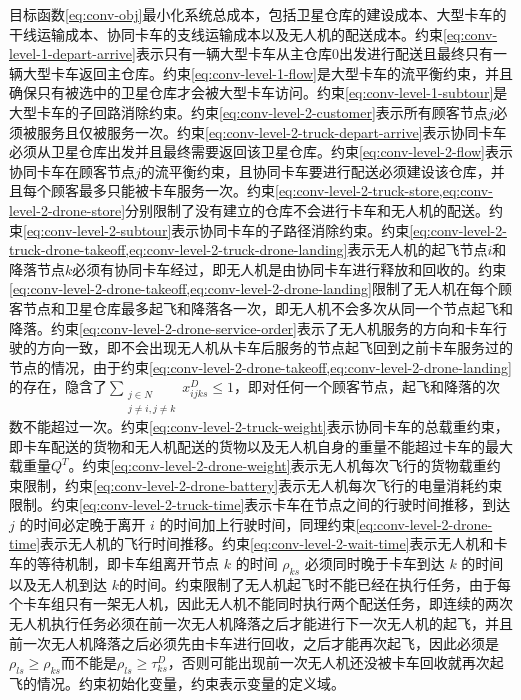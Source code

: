 \documentclass[fontset=none]{ctexart}
\begin{document}
目标函数\cref{eq:conv-obj}最小化系统总成本，包括卫星仓库的建设成本、大型卡车的干线运输成本、协同卡车的支线运输成本以及无人机的配送成本。约束\cref{eq:conv-level-1-depart-arrive}表示只有一辆大型卡车从主仓库$0$出发进行配送且最终只有一辆大型卡车返回主仓库。约束\cref{eq:conv-level-1-flow}是大型卡车的流平衡约束，并且确保只有被选中的卫星仓库才会被大型卡车访问。约束\cref{eq:conv-level-1-subtour}是大型卡车的子回路消除约束。约束\cref{eq:conv-level-2-customer}表示所有顾客节点$j$必须被服务且仅被服务一次。约束\cref{eq:conv-level-2-truck-depart-arrive}表示协同卡车必须从卫星仓库出发并且最终需要返回该卫星仓库。约束\cref{eq:conv-level-2-flow}表示协同卡车在顾客节点$j$的流平衡约束，且协同卡车要进行配送必须建设该仓库，并且每个顾客最多只能被卡车服务一次。约束\cref{eq:conv-level-2-truck-store,eq:conv-level-2-drone-store}分别限制了没有建立的仓库不会进行卡车和无人机的配送。约束\cref{eq:conv-level-2-subtour}表示协同卡车的子路径消除约束。约束\cref{eq:conv-level-2-truck-drone-takeoff,eq:conv-level-2-truck-drone-landing}表示无人机的起飞节点$i$和降落节点$k$必须有协同卡车经过，即无人机是由协同卡车进行释放和回收的。约束\cref{eq:conv-level-2-drone-takeoff,eq:conv-level-2-drone-landing}限制了无人机在每个顾客节点和卫星仓库最多起飞和降落各一次，即无人机不会多次从同一个节点起飞和降落。约束\cref{eq:conv-level-2-drone-service-order}表示了无人机服务的方向和卡车行驶的方向一致，即不会出现无人机从卡车后服务的节点起飞回到之前卡车服务过的节点的情况，由于约束\cref{eq:conv-level-2-drone-takeoff,eq:conv-level-2-drone-landing}的存在，隐含了$\sum_{\substack{j \in N\\ j \neq i, j \neq k}}x_{ijks}^D \leq 1$，即对任何一个顾客节点，起飞和降落的次数不能超过一次。约束\cref{eq:conv-level-2-truck-weight}表示协同卡车的总载重约束，即卡车配送的货物和无人机配送的货物以及无人机自身的重量不能超过卡车的最大载重量$Q^T$。约束\cref{eq:conv-level-2-drone-weight}表示无人机每次飞行的货物载重约束限制，约束\cref{eq:conv-level-2-drone-battery}表示无人机每次飞行的电量消耗约束限制。约束\cref{eq:conv-level-2-truck-time}表示卡车在节点之间的行驶时间推移，到达 $j$ 的时间必定晚于离开 $i$ 的时间加上行驶时间，同理约束\cref{eq:conv-level-2-drone-time}表示无人机的飞行时间推移。约束\cref{eq:conv-level-2-wait-time}表示无人机和卡车的等待机制，即卡车组离开节点 $k$ 的时间 $\rho_{ks}$ 必须同时晚于卡车到达 $k$ 的时间以及无人机到达 $k$的时间。约束限制了无人机起飞时不能已经在执行任务，由于每个卡车组只有一架无人机，因此无人机不能同时执行两个配送任务，即连续的两次无人机执行任务必须在前一次无人机降落之后才能进行下一次无人机的起飞，并且前一次无人机降落之后必须先由卡车进行回收，之后才能再次起飞，因此必须是$\rho_{ls} \geq \rho_{ks}$而不能是$\rho_{ls} \geq \tau_{ks}^D$，否则可能出现前一次无人机还没被卡车回收就再次起飞的情况。约束初始化变量，约束表示变量的定义域。
\end{document}
